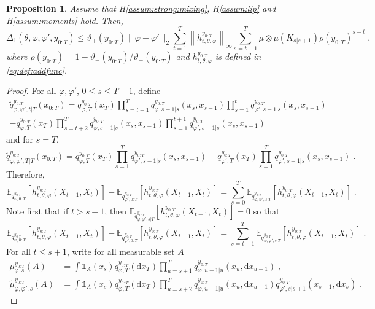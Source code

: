 \documentclass{article}
\newtheorem{proposition}[theorem]{Proposition}
\newcommand{\udlowvar}{\vartheta_-}
\newcommand{\udupvar}{\vartheta_+}
\newcommand{\1}{\mathbbm{1}}
\newcommand{\rmd}{\ensuremath{\mathrm{d}}}
\newcommand{\eqsp}{\;}
\begin{document}
\begin{proposition}
Assume that H\ref{assum:strong:mixing}, H\ref{assum:lip} and H\ref{assum:moments} hold. Then,
$$
\Delta_1(\theta, \varphi, \varphi', y_{0:T}) \leq \udupvar(y_{0:T})\|\varphi-\varphi'\|_2\sum_{t=1}^T\left\|h^{y_{0:T}}_{t,\theta,\varphi}\right\|_\infty\sum_{s=t-1}^T\mu\otimes\mu (K_{s|s+1}) \rho(y_{0:T})^{s-t} \eqsp,
$$
where $\rho(y_{0:T}) = 1-\udlowvar(y_{0:T})/\udupvar(y_{0:T})$ and $h^{y_{0:T}}_{t,\theta,\varphi}$ is defined in \eqref{eq:def:addfunc}.
\end{proposition}
\begin{proof}
For all $\varphi,\varphi'$, $0\leq s \leq T-1$, define
\begin{multline*}
\tilde q^{y_{0:T}}_{\varphi,\varphi',t|T}(x_{0:T}) = q^{y_{0:T}}_{\varphi,T}(x_T)\prod_{s=t+1}^Tq^{y_{0:T}}_{\varphi,s-1|s}(x_s,x_{s-1})\prod_{s=1}^tq^{y_{0:T}}_{\varphi',s-1|s}(x_s,x_{s-1}) \\
- q^{y_{0:T}}_{\varphi,T}(x_T)\prod_{s=t+2}^Tq^{y_{0:T}}_{\varphi,s-1|s}(x_s,x_{s-1})\prod_{s=1}^{t+1}q^{y_{0:T}}_{\varphi',s-1|s}(x_s,x_{s-1})
\end{multline*}
and for $s=T$,
$$
\tilde q^{y_{0:T}}_{\varphi,\varphi',T|T}(x_{0:T}) = q^{y_{0:T}}_{\varphi,T}(x_T)\prod_{s=1}^Tq^{y_{0:T}}_{\varphi',s-1|s}(x_s,x_{s-1}) 
- q^{y_{0:T}}_{\varphi',T}(x_T)\prod_{s=1}^Tq^{y_{0:T}}_{\varphi',s-1|s}(x_s,x_{s-1})\eqsp.
$$
Therefore,
$$
\mathbb{E}_{q^{y_{0:T}}_{\varphi,0:T}}\left[h^{y_{0:T}}_{t,\theta,\varphi}(X_{t-1},X_t)\right] - \mathbb{E}_{q^{y_{0:T}}_{\varphi',0:T}}\left[h^{y_{0:T}}_{t,\theta,\varphi}(X_{t-1},X_t)\right] = \sum_{s=0}^T \mathbb{E}_{\tilde q^{y_{0:T}}_{\varphi,\varphi',s|T}}\left[h^{y_{0:T}}_{t,\theta,\varphi}(X_{t-1},X_t)\right] \eqsp.
$$
Note first that if $t> s+1$, then $\mathbb{E}_{\tilde q^{y_{0:T}}_{\varphi,\varphi',s|T}}\left[h^{y_{0:T}}_{t,\theta,\varphi}(X_{t-1},X_t)\right] = 0$ so that
$$
\mathbb{E}_{q^{y_{0:T}}_{\varphi,0:T}}\left[h^{y_{0:T}}_{t,\theta,\varphi}(X_{t-1},X_t)\right] - \mathbb{E}_{q^{y_{0:T}}_{\varphi',0:T}}\left[h^{y_{0:T}}_{t,\theta,\varphi}(X_{t-1},X_t)\right] = \sum_{s=t-1}^T \mathbb{E}_{\tilde q^{y_{0:T}}_{\varphi,\varphi',s|T}}\left[h^{y_{0:T}}_{t,\theta,\varphi}(X_{t-1},X_t)\right] \eqsp.
$$
For all $t\leq s+1$, write for all measurable set $A$
\begin{align*}
\mu^{y_{0:T}}_{\varphi,s}(A) &= \int \mathds{1}_A(x_s) q^{y_{0:T}}_{\varphi,T}(\rmd x_T)\prod_{u=s+1}^Tq^{y_{0:T}}_{\varphi,u-1|u}(x_u,\rmd x_{u-1})\eqsp,\\
\tilde\mu^{y_{0:T}}_{\varphi,\varphi',s}(A) &= \int \mathds{1}_A(x_s) q^{y_{0:T}}_{\varphi,T}(\rmd x_T)\prod_{u=s+2}^Tq^{y_{0:T}}_{\varphi,u-1|u}(x_u,\rmd x_{u-1})q^{y_{0:T}}_{\varphi',s|s+1}(x_{s+1},\rmd x_{s})\eqsp.

\end{align*}
\end{proof}
\end{document}
